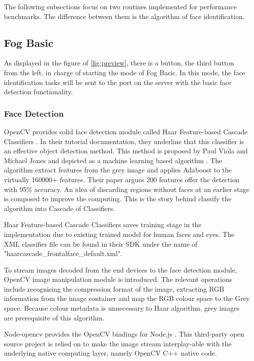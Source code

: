 The following subsections focus on two routines implemented for performance benchmarks. The difference between them is the algorithm of face identification.

\subsection{Fog Basic}
As displayed in the figure of \ref{fig:preview}, there is a button, the third button from the left, in charge of starting the mode of Fog Basic. In this mode, the face identification tasks will be sent to the port on the server with the basic face detection functionality. 

\subsubsection{Face Detection}
OpenCV provides solid face detection module called Haar Feature-based Cascade Classifiers \cite{opencv_library}. In their tutorial documentation, they underline that this classifier is an effective object detection method. This method is proposed by Paul Viola and Michael Jones and depicted as a machine learning based algorithm  \cite{viola2001rapid}. The algorithm extract features from the grey image and applies Adaboost to the virtually 160000+ features. Their paper argues 200 features offer the detection with 95\% accuracy. An idea of discarding regions without faces at an earlier stage is composed to improve the computing. This is the story behind classify the algorithm into Cascade of Classifiers.

Haar Feature-based Cascade Classifiers saves training stage in the implementation due to existing trained model for human faces and eyes. The XML classifier file can be found in their SDK under the name of "haarcascade\_frontalface\_default.xml".

To stream images decoded from the end devices to the face detection module, OpenCV image manipulation module is introduced. The relevant operations include recognising the compression format of the image, extracting RGB information from the image container and map the RGB colour space to the Grey space. Because colour metadata is unnecessary to Haar algorithm, grey images are prerequisite of this algorithm.

Node-opencv provides the OpenCV bindings for Node.js  \cite{node-opencv}. This third-party open source project is relied on to make the image stream interplay-able with the underlying native computing layer, namely OpenCV C++ native code.

